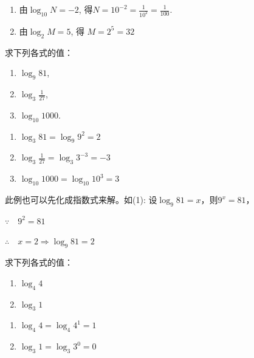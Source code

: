\begin{solution}
\begin{enumerate}[(1)]
    \item 由$\log_{10}N=-2$, 得$N=10^{-2}=\frac{1}{10^{2}}=\frac{1}{100}$.
    \item 由$\log _2M= 5$, 得 $M= 2^5= 32$
\end{enumerate}
\end{solution}
 
\begin{multicols}{2}
    \begin{example}
    求下列各式的值：
\begin{enumerate}[(1)]
    \item $\log_9 81$,
    \item $\log_3\frac 1{27}$,
    \item $\log_{10} 1000$.
\end{enumerate}    

\end{example}
 
\begin{solution}
\begin{enumerate}[(1)]
    \item $\log_{3}81=\log_9 9^2=2$
    \item $\log_3\frac 1{27}=\log_{3}3^{- 3}= - 3$
\item $\log_{10}1000=\log_{10}10^3=3$
\end{enumerate}
\end{solution} 
\end{multicols}


\begin{rmk}
    此例也可以先化成指数式来解。如(1): 
    设$\log_9 81=x$，则$9^x=81$，

$\because\quad 9^2=81$

$\therefore\quad x=2\Longrightarrow \log_9 81=2$
\end{rmk}

\begin{multicols}{2}
\begin{example}
    求下列各式的值：
\begin{enumerate}[(1)]
    \item $\log_4 4$
    \item $\log_3 1$
\end{enumerate}
\end{example}
 
\begin{solution}
    \begin{enumerate}[(1)]
        \item $\log_4 4=\log_4 4^1=1$
        \item $\log_3 1=\log_3 3^0=0$
    \end{enumerate}
\end{solution}    
\end{multicols}


